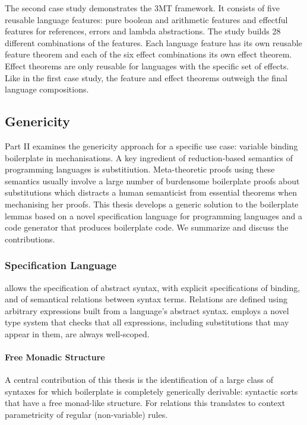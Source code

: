 The second case study demonstrates the 3MT framework. It consists of five
reusable language features: pure boolean and arithmetic features and effectful
features for references, errors and lambda abstractions. The study builds 28
different combinations of the features. Each language feature has its own
reusable feature theorem and each of the six effect combinations its own effect
theorem. Effect theorems are only reusable for languages with the specific set
of effects. Like in the first case study, the feature and effect theorems
outweigh the final language compositions.



\subsection{Genericity}
Part II examines the genericity approach for a specific use case: variable
binding boilerplate in mechanisations. A key ingredient of reduction-based
semantics of programming languages is substitiution. Meta-theoretic proofs using
these semantics usually involve a large number of burdensome boilerplate proofs
about substitutions which distracts a human semanticist from essential theorems
when mechanising her proofs. This thesis develops a generic solution to the
boilerplate lemmas based on a novel specification language \Knot for programming
languages and a code generator \Needle that produces boilerplate code. We
summarize and discuss the contributions.

\subsubsection{Specification Language}
\Knot allows the specification of abstract syntax, with explicit specifications
of binding, and of semantical relations between syntax terms. Relations are
defined using arbitrary expressions built from a language's abstract syntax.
\Knot employs a novel type system that checks that all expressions, including
substitutions that may appear in them, are always well-scoped.


\paragraph{Free Monadic Structure}
A central contribution of this thesis is the identification of a large class of
syntaxes for which boilerplate is completely generically derivable: syntactic
sorts that have a free monad-like structure. For relations this translates to
context parametricity of regular (non-variable) rules.

